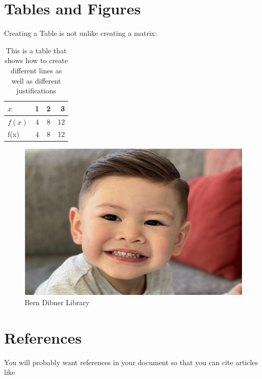 \documentclass[12pt]{article}
\begin{document}
    \section{Tables and Figures}
Creating a Table is not unlike creating a matrix:
\begin{table}[h!]
    \centering
    \caption{This is a table that shows how to create different lines as well as different justifications}
    \begin{tabular}{|l||c|c|r|}
    \hline
    $x$&1&2&3\\
    \hline
    $f(x)$&4&8&12\\
    f(x)&4&8&12\\
    \hline
    \end{tabular}
\end{table}

\begin{figure}[h!]
    \centering
    \includegraphics[width=\textwidth]{bg-8}
\caption{Bern Dibner Library}
\end{figure}
\section{References}
You will probably want references in your document so that you can cite articles like \cite{frenkel_fine_2013, frenkel_optical_2013, frenkel_temperature_2012, frenkel_whispering-gallery_2013,frenkel_-chip_2016}


\end{document}

